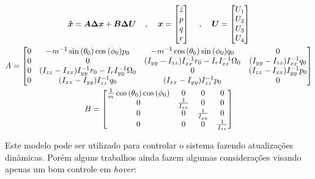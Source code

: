 \documentclass[main.tex]{subfiles}
\begin{document}
\begin{equation}\label{eq:linearizado}
    \begin{gathered}
        \boldsymbol{\dot{x}} = \boldsymbol{A\Delta x} + \boldsymbol{B\Delta U}\hspace{0.4cm}, \hspace{0.4cm} \boldsymbol{x} = \begin{bmatrix}
        \dot{z}\\ 
        p\\
        q\\
        r
        \end{bmatrix} \hspace{0.4cm} , \hspace{0.4cm} \boldsymbol{U} = \begin{bmatrix}
            U_1\\ 
            U_2\\
            U_3\\
            U_4
        \end{bmatrix}\\
        A = \begin{bmatrix}
            0 & - m^{-1}\sin{(\theta_0)}\cos{(\phi_0)}p_0&- m^{-1}\cos{(\theta_0)}\sin{(\phi_0)}q_0&0\\ 
            0&0&(I_{yy} - I_{zz})I_{xx}^{-1}r_0 - I_{r}I_{xx}^{-1}\Omega_0&(I_{yy} - I_{zz})I_{xx}^{-1}q_0\\
            0&(I_{zz} - I_{xx})I_{yy}^{-1}r_0 - I_{r}I_{yy}^{-1}\Omega_0&0&(I_{zz} - I_{xx})I_{yy}^{-1}p_0\\
            0&(I_{xx} - I_{yy})I_{zz}^{-1}q_0&(I_{xx} - I_{yy})I_{zz}^{-1}p_0&0
        \end{bmatrix}\\ 
        B = \begin{bmatrix}
            \frac{1}{m}\cos{(\theta_0)}\cos{(\phi_0)}&0&0&0\\ 
            0&\frac{1}{I_{xx}}&0&0\\
            0&0&\frac{1}{I_{yy}}&0\\
            0&0&0&\frac{1}{I_{zz}}
        \end{bmatrix}
    \end{gathered}
\end{equation}

Este modelo pode ser utilizado para controlar o sistema fazendo atualizações dinâmicas. Porém alguns trabalhos ainda fazem algumas considerações visando apenas um bom controle em \textit{hover}:
\end{document}
